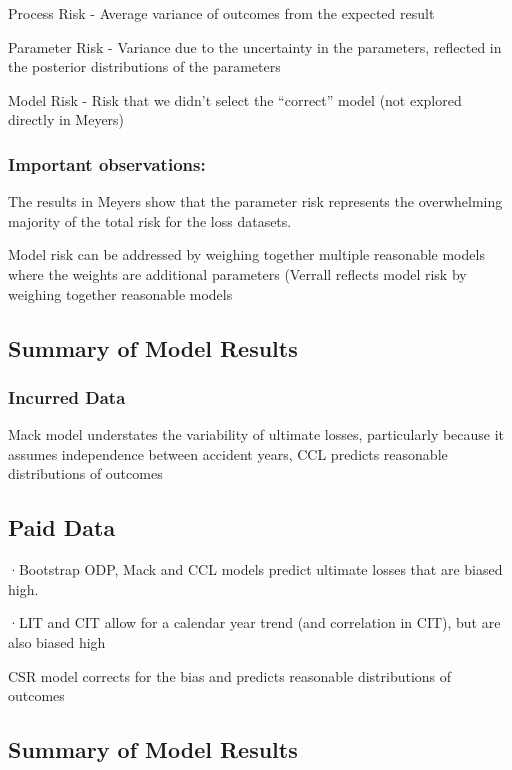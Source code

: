 \documentclass[
]{article}
\begin{document}
Process Risk - Average variance of outcomes from the expected result

Parameter Risk - Variance due to the uncertainty in the parameters,
reflected in the posterior distributions of the parameters

Model Risk - Risk that we didn't select the ``correct'' model (not
explored directly in Meyers)

\subsubsection{Important observations:}\label{important-observations}

The results in Meyers show that the parameter risk represents the
overwhelming majority of the total risk for the loss datasets.

Model risk can be addressed by weighing together multiple reasonable
models where the weights are additional parameters (Verrall reflects
model risk by weighing together reasonable models

\subsection{Summary of Model Results}\label{summary-of-model-results}

\subsubsection{Incurred Data}\label{incurred-data}

Mack model understates the variability of ultimate losses, particularly
because it assumes independence between accident years, CCL predicts
reasonable distributions of outcomes

\subsection{Paid Data}\label{paid-data}

·Bootstrap ODP, Mack and CCL models predict ultimate losses that are
biased high.

·LIT and CIT allow for a calendar year trend (and correlation in CIT),
but are also biased high

CSR model corrects for the bias and predicts reasonable distributions of
outcomes

\subsection{Summary of Model Results}\label{summary-of-model-results-1}
\end{document}
